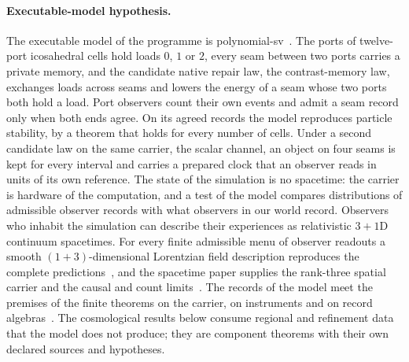 \paragraph{Executable-model hypothesis.}
The executable model of the programme is polynomial-sv~\cite{ophmodel}. The
ports of twelve-port icosahedral cells hold loads $0$, $1$ or $2$, every seam
between two ports carries a private memory, and the candidate native repair
law, the contrast-memory law, exchanges loads across seams and lowers the
energy of a seam whose two ports both hold a load. Port observers count their
own events and admit a seam record only when both ends agree. On its agreed records the model reproduces particle stability, by a theorem that holds for every number of cells. Under a second candidate law on the same carrier, the scalar channel, an object on four seams is kept for every interval and carries a prepared clock that an observer reads in units of its own reference. The state of
the simulation is no spacetime: the carrier is hardware of the computation,
and a test of the model compares distributions of admissible observer records
with what observers in our world record. Observers who inhabit the simulation
can describe their experiences as relativistic $3{+}1$D continuum
spacetimes. For every finite admissible menu of observer readouts a smooth
$(1+3)$-dimensional Lorentzian field description reproduces the complete
predictions~\cite{ophsynthesis,ophEinstein}, and the spacetime paper supplies
the rank-three spatial carrier and the causal and count
limits~\cite{ophEinstein}. The records of the model meet the premises of the
finite theorems on the carrier, on instruments and on record
algebras~\cite{ophmodel}. The cosmological results below consume regional
and refinement data that the model does not produce; they are component
theorems with their own declared sources and hypotheses.
